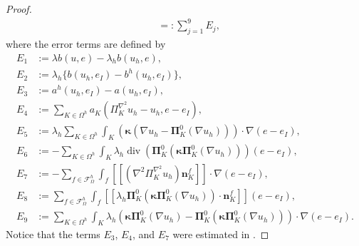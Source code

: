 \documentclass[final,reqno]{elsarticle}
\newcommand\vdiv{\mathop{\mathrm{div}}\nolimits}
\newcommand\cF{\mathcal{F}}
\newcommand{\jump}[1]{[\![#1]\!]}
\def\bn{\boldsymbol{n}}
\def\bkappa{\boldsymbol{\kappa}}
\def\bPi{\mathbf{\Pi}}
\begin{document}
\begin{proof}
\begin{align}
   & =:\sum\limits_{j=1}^9 E_j, \label{auxboundrelab}
\end{align}
where the error terms are defined by
\begin{align*}
      E_1&:= \lambda b(u,e) - \lambda_h b(u_h,e),\\  
      E_2&:=  \lambda_h \big\{b(u_h,e_I)-b^h(u_h,e_I) \big\},\\
      E_3&:=    a^h(u_h,e_I)-a(u_h,e_I), \nonumber \\
      E_4&:=\sum_{K\in \Omega^h} a_K(\Pi_K^{\nabla^2} u_h-u_h,e-e_I),\\ E_5&:= \lambda_h \sum_{K\in \Omega^h} \int_K (\bkappa(\nabla u_h - \bPi_K^0 (\nabla u_h)))\cdot \nabla (e-e_I), \nonumber\\
      E_6&:= - \sum_{K\in \Omega^h} \int_{K}\lambda_h \vdiv\left( \bPi_K^0 (\bkappa \bPi_K^0(\nabla u_h))\right) (e-e_I),\\
      E_7&:=- \sum_{f\in \cF^h_\Omega} \int_f \jump{(\nabla^2\Pi_K^{\nabla^2} u_h)\bn_K^f}\cdot \nabla (e-e_I),\nonumber\\
      E_8&:= \sum_{f\in \mathcal{F}^h_\Omega} \int_f
        \jump{\lambda_h\bPi_K^0(\bkappa \bPi_K^0(\nabla u_h ))\cdot \bn_K^{f}}(e-e_I),\nonumber\\
      E_9&:=\sum_{K\in \Omega^h}\int_K \lambda_h \left(\bkappa \bPi_K^0(\nabla u_h)-\bPi_K^0(\bkappa \bPi_K^0(\nabla u_h))\right) \cdot \nabla (e-e_I).\nonumber
\end{align*}
Notice that the terms $E_3$, $E_4$, and $E_7$ were estimated in \cite[Theorem~14]{dassi2025posteriorierrorestimatesc1}. 


\end{proof}
\end{document}
